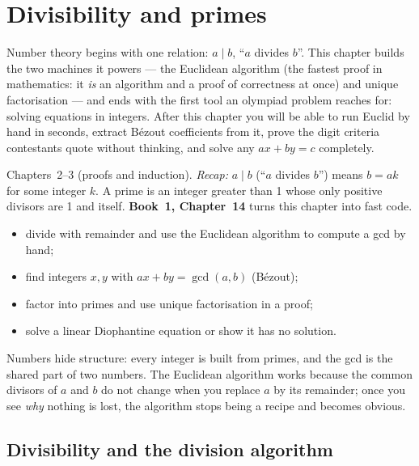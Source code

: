\chapter{Divisibility and primes}\label{ch:div}

Number theory begins with one relation: $a \mid b$, ``$a$ divides $b$''.
This chapter builds the two machines it powers --- the Euclidean algorithm
(the fastest proof in mathematics: it \emph{is} an algorithm and a proof of
correctness at once) and unique factorisation --- and ends with the first
tool an olympiad problem reaches for: solving equations in integers. After
this chapter you will be able to run Euclid by hand in seconds, extract
B\'ezout coefficients from it, prove the digit criteria contestants quote
without thinking, and solve any $ax + by = c$ completely.

\begin{rulebox}
Chapters~2--3 (proofs and induction). \emph{Recap:} $a\mid b$ (``$a$ divides $b$'') means $b=ak$ for some integer $k$. A prime is an integer greater than 1 whose only positive divisors are 1 and itself. \textbf{Book~1, Chapter~14} turns this chapter into fast code.
\end{rulebox}
\begin{wins}
\begin{itemize}
\item divide with remainder and use the Euclidean algorithm to compute a gcd by hand;
\item find integers $x,y$ with $ax+by=\gcd(a,b)$ (B\'ezout);
\item factor into primes and use unique factorisation in a proof;
\item solve a linear Diophantine equation or show it has no solution.
\end{itemize}
\end{wins}
\begin{principle}
Numbers hide structure: every integer is built from primes, and the gcd is the shared part of two numbers. The Euclidean algorithm works because the common divisors of $a$ and $b$ do not change when you replace $a$ by its remainder; once you see \emph{why} nothing is lost, the algorithm stops being a recipe and becomes obvious.
\end{principle}

\section{Divisibility and the division algorithm}\label{sec:div}

